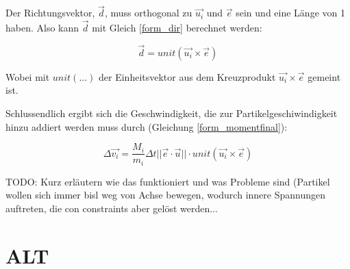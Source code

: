 Der Richtungsvektor, $\vec{d}$, muss orthogonal zu $\vec{u_i}$ und $\vec{e}$ sein und eine Länge von 1 haben. Also kann $\vec{d}$ mit Gleich \ref{form_dir} berechnet werden:

\begin{equation}
\vec{d} = unit(\vec{u_i} \times \vec{e} )
\label{form_dir}
\end{equation}

Wobei mit $unit(...)$ der Einheitsvektor aus dem Kreuzprodukt $\vec{u_i} \times \vec{e} $ gemeint ist.

Schlussendlich ergibt sich die Geschwindigkeit, die zur Partikelgeschiwindigkeit hinzu addiert werden muss durch (Gleichung \ref{form_momentfinal}):

\begin{equation}
\Delta \vec{v_i} =  \dfrac{M_i}{m_i} \Delta t ||\vec{e} \cdot \vec{u}|| \cdot unit(\vec{u_i} \times \vec{e} )
\label{form_momentfinal}
\end{equation}

TODO: Kurz erläutern wie das funktioniert und was Probleme sind (Partikel wollen sich immer bisl weg von Achse bewegen, wodurch innere Spannungen auftreten, die con constraints aber gelöst werden...

\section{ALT}

